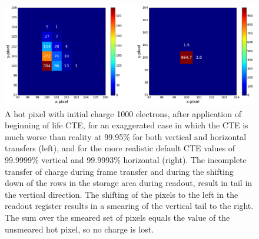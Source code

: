 \documentclass[11pt]{article}      %
\begin{document}
\begin{figure}[htbp]
  \begin{center}
    \includegraphics[width=\textwidth]{cte_bol_hot.png}
    \caption{A hot pixel with initial charge 1000 electrons, after application of beginning of life CTE, for an exaggerated case in which the CTE is much worse than reality at 99.95\% for both vertical and horizontal transfers (left), and for the more realistic default CTE values of 99.9999\% vertical and 99.9993\% horizontal (right). The incomplete transfer of charge during frame transfer and during the shifting down of the rows in the storage area during readout, result in tail in the vertical direction. The shifting of the pixels to the left in the readout register results in a smearing of the vertical tail to the right. The sum over the smeared set of pixels equals the value of the unsmeared hot pixel, so no charge is lost.}
    \label{fig:cte_bol_hot}
  \end{center}
\end{figure}
\end{document}
